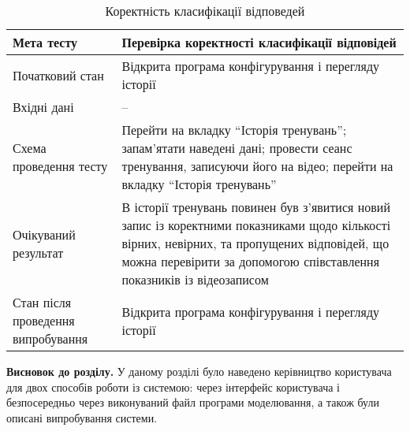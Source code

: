 \small\begin{longtable}{| C{6cm} | C{10cm} |}
  \caption{Коректність класифікації відповедей}
  \label{table:answer-classification} \\
  \hline
  Мета тесту & Перевірка коректності класифікації відповідей \\
  \hline
  Початковий стан
  & Відкрита програма конфігурування і перегляду історії \\
  \hline
  Вхідні дані
  & -- \\
  \hline
  Схема проведення тесту
  & Перейти на вкладку ``Історія тренувань''; запам'ятати наведені дані;
  провести сеанс тренування, записуючи його на відео;
  перейти на вкладку ``Історія тренувань'' \\
  \hline
  Очікуваний результат
  & В історії тренувань повинен був з'явитися новий запис із коректними показниками
  щодо кількості вірних, невірних, та пропущених відповідей, що можна перевірити
  за допомогою співставлення показників із відеозаписом \\
  \hline
  Стан після проведення випробування
  & Відкрита програма конфігурування і перегляду історії \\
  \hline
\end{longtable}\normalsize

\textbf{Висновок до розділу.} У даному розділі було наведено керівництво користувача для двох способів роботи із системою: через інтерфейс користувача і безпосередньо через виконуваний файл програми моделювання, а також були описані випробування системи.